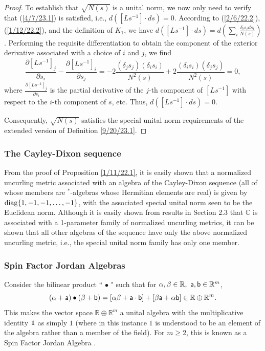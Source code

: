 \documentclass{amsart}
\numberwithin{equation}{section}
\theoremstyle{definition}
\numberwithin{theorem}{section}
\begin{document}
\begin{proof}
 To establish that $\sqrt{N(s)}$ is a unital norm, we  now only need to verify that (\ref{4/7/23.1}) is satisfied, i.e., $d\left([Ls^{-1}]\cdot ds\right)=0$.  According to (\ref{2/6/22.2}), (\ref{1/12/22.2}), and the definition  of $K_1$, we have $d\left([Ls^{-1}]\cdot ds\right) = d\left(\sum_i \frac{\delta_is_i ds_i}{N(s)}\right)$.  Performing the requisite differentiation to obtain the component of the exterior derivative associated with a choice of $i$ and $j$, we find \[ \frac{\partial [Ls^{-1}]_j}{\partial s_i} - \frac{\partial [Ls^{-1}]_i}{\partial s_j} = -2\frac{(\delta_j s_j)(\delta_i s_i)}{N^2(s)} +
2\frac{(\delta_i s_i)(\delta_j s_j)}{N^2(s)} = 0,  \] where $\frac{\partial [Ls^{-1}]_j}{\partial s_i}$ is the partial derivative of the $j$-th component of $[Ls^{-1}]$ with respect to the $i$-th component of $s$, etc. Thus,  $d\left([Ls^{-1}]\cdot ds\right) = 0$.

Consequently, $\sqrt{N(s)}$ satisfies the special unital norm requirements of the extended version of Definition \ref{9/20/23.1}.  
\end{proof}


\subsubsection{The Cayley-Dixon sequence}  From the proof of Proposition \ref{1/11/22.1}, it is easily shown that a normalized uncurling metric associated with an algebra of the Cayley-Dixon sequence (all of whose members are $^*$-algebras whose Hermitian elements are real) is given by ${\rm diag}\{1,-1,-1,\dots,-1\}$, with the associated special unital norm seen to be the Euclidean norm. Although it is easily shown from results in Section 2.3 that $\mathbb{C}$ is associated with a 1-parameter family of normalized uncurling metrics, it can be shown that all other algebras of the sequence have only the above normalized uncurling metric, i.e., the special unital norm family has only one member.  
 
\subsubsection{Spin Factor Jordan Algebras}  Consider the bilinear product ``$\,\bullet\,$" such that for
$\alpha,\beta\in \mathbb{R},\,\, {\sf a},{\sf b}\in \mathbb{R}^m$,  \begin{equation}  (\alpha+ {\sf a})\bullet (\beta + {\sf b}) =
    [\alpha \beta + {\sf a} \cdot {\sf b}] + [ \beta {\sf a} + \alpha {\sf b}] \in \mathbb{R}\oplus \mathbb{R}^m. \label{12/24/18.1}\end{equation}  This makes the vector space $\mathbb{R}\oplus \mathbb{R}^m$ a unital algebra with the multiplicative identity ${\bf 1}$ as simply $1$ (where in this instance $1$ is understood to be an element of the algebra rather than a member of the field).  For $m\ge 2$, this is known as a Spin Factor Jordan Algebra \cite{mccrimmon:2004}.
\end{document}
